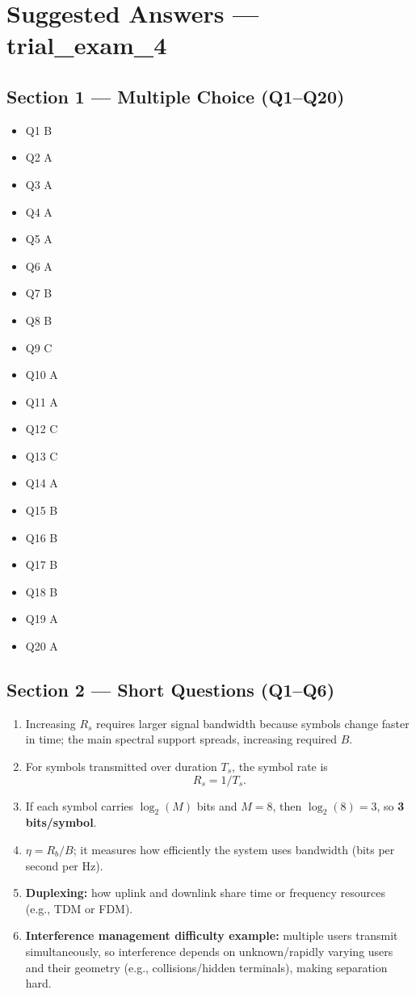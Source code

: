 \documentclass[11pt,a4paper]{article}
\begin{document}
\section*{Suggested Answers --- trial\_exam\_4}

\subsection*{Section 1 --- Multiple Choice (Q1--Q20)}
\begin{itemize}
    \item Q1 B
    \item Q2 A
    \item Q3 A
    \item Q4 A
    \item Q5 A
    \item Q6 A
    \item Q7 B
    \item Q8 B
    \item Q9 C
    \item Q10 A
    \item Q11 A
    \item Q12 C
    \item Q13 C
    \item Q14 A
    \item Q15 B
    \item Q16 B
    \item Q17 B
    \item Q18 B
    \item Q19 A
    \item Q20 A
\end{itemize}

\subsection*{Section 2 --- Short Questions (Q1--Q6)}
\begin{enumerate}[label=\arabic*.]
    \item Increasing $R_s$ requires larger signal bandwidth because symbols change faster in time; the main spectral support spreads, increasing required $B$.
    \item For symbols transmitted over duration $T_s$, the symbol rate is
    \[
    R_s = 1/T_s.
    \]
    \item If each symbol carries $\log_2(M)$ bits and $M=8$, then $\log_2(8)=3$, so \textbf{3 bits/symbol}.
    \item $\eta = R_b/B$; it measures how efficiently the system uses bandwidth (bits per second per Hz).
    \item \textbf{Duplexing:} how uplink and downlink share time or frequency resources (e.g., TDM or FDM).
    \item \textbf{Interference management difficulty example:} multiple users transmit simultaneously, so interference depends on unknown/rapidly varying users and their geometry (e.g., collisions/hidden terminals), making separation hard.
\end{enumerate}
\end{document}
